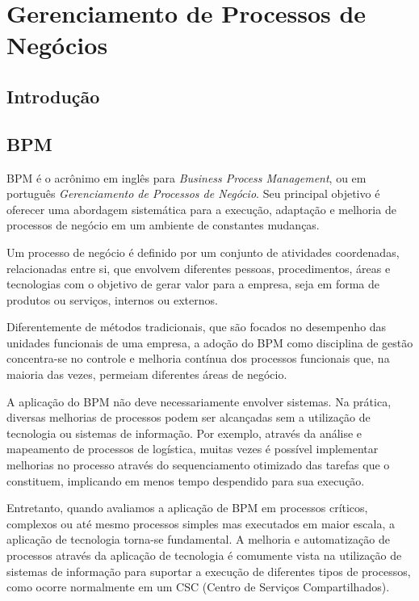 \chapter{Gerenciamento de Processos de Negócios}\label{chp:bpm}

\section{Introdução}\label{sec:bpm-intro}


\section{BPM}\label{sec:bpm-bpm}
BPM\cite{bpm} é o acrônimo em inglês para \textit{Business Process Management}, ou em português \textit{Gerenciamento de Processos de Negócio}. Seu principal objetivo é oferecer uma abordagem sistemática para a execução, adaptação e melhoria de processos de negócio em um ambiente de constantes mudanças. 

Um processo de negócio é definido por um conjunto de atividades coordenadas, relacionadas entre si, que envolvem diferentes pessoas, procedimentos, áreas e tecnologias com o objetivo de gerar valor para a empresa, seja em forma de produtos ou serviços, internos ou externos.

Diferentemente de métodos tradicionais, que são focados no desempenho das unidades funcionais de uma empresa, a adoção do BPM como disciplina de gestão concentra-se no controle e melhoria contínua dos processos funcionais que, na maioria das vezes, permeiam diferentes áreas de negócio.

A aplicação do BPM não deve necessariamente envolver sistemas. Na prática, diversas melhorias de processos podem ser alcançadas sem a utilização de tecnologia ou sistemas de informação. Por exemplo, através da análise e mapeamento de processos de logística, muitas vezes é possível implementar melhorias no processo através do sequenciamento otimizado das tarefas que o constituem, implicando em menos tempo despendido para sua execução.

Entretanto, quando avaliamos a aplicação de BPM em processos críticos, complexos ou até mesmo processos simples mas executados em maior escala, a aplicação de tecnologia torna-se fundamental. A melhoria e automatização de processos através da aplicação de tecnologia é comumente vista na utilização de sistemas de informação para suportar a execução de diferentes tipos de processos, como ocorre normalmente em um CSC\cite{csc} (Centro de Serviços Compartilhados).


